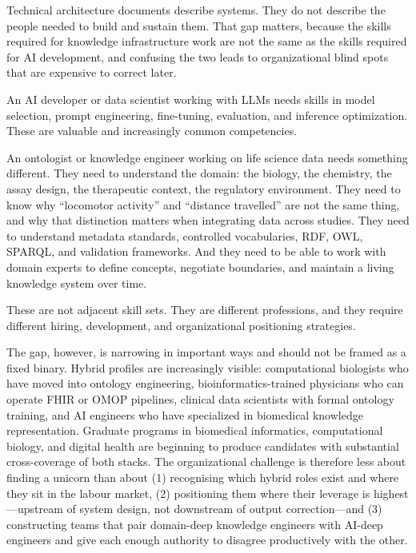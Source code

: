 \documentclass[man,12pt,donotrepeattitle]{apa7}
\begin{document}
Technical architecture documents describe systems. They do not describe
the people needed to build and sustain them. That gap matters, because the
skills required for knowledge infrastructure work are not the same as the
skills required for AI development, and confusing the two leads to
organizational blind spots that are expensive to correct later.

An AI developer or data scientist working with LLMs needs skills in model
selection, prompt engineering, fine-tuning, evaluation, and inference
optimization. These are valuable and increasingly common competencies.

An ontologist or knowledge engineer working on life science data needs
something different. They need to understand the domain: the biology, the
chemistry, the assay design, the therapeutic context, the regulatory
environment. They need to know why ``locomotor activity'' and ``distance
travelled'' are not the same thing, and why that distinction matters when
integrating data across studies. They need to understand metadata standards,
controlled vocabularies, RDF, OWL, SPARQL, and validation frameworks. And
they need to be able to work with domain experts to define concepts,
negotiate boundaries, and maintain a living knowledge system over time.

These are not adjacent skill sets. They are different professions, and they
require different hiring, development, and organizational positioning
strategies.

The gap, however, is narrowing in important ways and should not be framed
as a fixed binary. Hybrid profiles are increasingly visible: computational
biologists who have moved into ontology engineering, bioinformatics-trained
physicians who can operate FHIR or OMOP pipelines, clinical data scientists
with formal ontology training, and AI engineers who have specialized in
biomedical knowledge representation. Graduate programs in biomedical
informatics, computational biology, and digital health are beginning to
produce candidates with substantial cross-coverage of both stacks. The
organizational challenge is therefore less about finding a unicorn than
about (1) recognising which hybrid roles exist and where they sit in the
labour market, (2) positioning them where their leverage is highest---upstream
of system design, not downstream of output correction---and (3) constructing
teams that pair domain-deep knowledge engineers with AI-deep engineers and
give each enough authority to disagree productively with the other.
\end{document}
